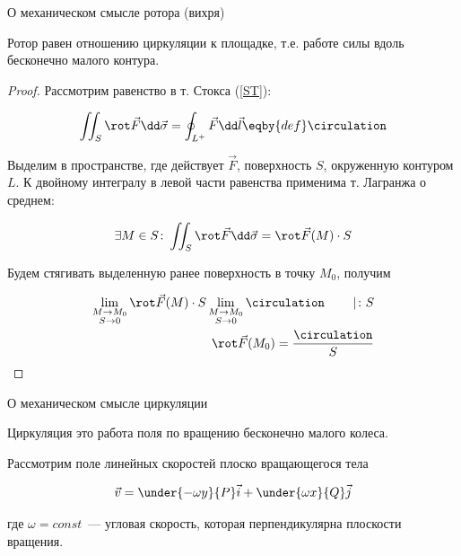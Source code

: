 
\begin{theorem}\label{rotor-m-sense}
  О механическом смысле ротора (вихря)

  Ротор равен отношению циркуляции к площадке, т.е. работе силы вдоль бесконечно
  малого контура.
\end{theorem}
\begin{proof}
  Рассмотрим равенство в т. Стокса (\ref{ST}):

  \begin{align*}
    \iint_{S} \rot \vec{F} \dd \vec{\sigma}
    = \oint_{L^{+}} \vec{F} \dd  \vec{l}
    \eqby{def} \circulation
  \end{align*}

  Выделим в пространстве, где действует \(\vec{F}\), поверхность \(S\),
  окруженную контуром \(L\). К двойному интегралу в левой части равенства
  применима т. Лагранжа о среднем:

  \begin{align*}
    \exists M \in S \colon
      \iint_{S} \rot \vec{F} \dd \vec{\sigma} = \rot \vec{F}(M) \cdot S
  \end{align*}

  Будем стягивать выделенную ранее поверхность в точку \(M_{0}\), получим

  \begin{align*}
    \lim_{\substack{M \to M_{0} \\ S \to 0}}
      \rot \vec{F}(M) \cdot S
    \lim_{\substack{M \to M_{0} \\ S \to 0}}
      \circulation
    \hspace{20pt} \mid \colon S
    \\
    \rot \vec{F}(M_{0}) = \frac{\circulation}{S}
  \end{align*}
\end{proof}

\begin{theorem}
  О механическом смысле циркуляции

  Циркуляция это работа поля по вращению бесконечно малого колеса.
\end{theorem}

\begin{twocolumns}
  
  \columnbreak

  Рассмотрим поле линейных скоростей плоско вращающегося тела

  \begin{align*}
    \vec{v}= \under{-\omega y}{P} \vec{i} + \under{\omega x}{Q} \vec{j}
  \end{align*}

  где \(\omega = const\)~--- угловая скорость, которая перпендикулярна
  плоскости вращения.
\end{twocolumns}

